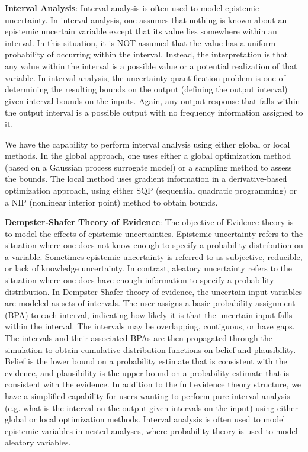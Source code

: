 \textbf{Interval Analysis}: Interval analysis is often used to model 
epistemic uncertainty. In interval analysis, one assumes that nothing 
is known about an epistemic uncertain variable except that its value lies 
somewhere within an interval.  In this situation, it is NOT 
assumed that the value has a uniform probability of occurring 
within the interval.  Instead, the interpretation is that 
any value within the interval is a possible value or a potential 
realization of that variable.  In interval analysis, the 
uncertainty quantification problem is one of determining the 
resulting bounds on the output (defining the output interval) 
given interval bounds on the inputs. Again, any output response 
that falls within the output interval is a possible output 
with no frequency information assigned to it.

We have the capability to perform interval analysis using either
global or local methods. In the global approach, one uses either a 
global optimization method (based on a Gaussian process surrogate model)
or a sampling method to assess the bounds. The
local method uses gradient information in a derivative-based 
optimization approach, using either SQP (sequential quadratic 
programming) or a NIP (nonlinear interior point) method to obtain bounds. 
 
\textbf{Dempster-Shafer Theory of Evidence}: The objective of Evidence
theory is to model the effects of epistemic uncertainties.  Epistemic
uncertainty refers to the situation where one does not know enough
to specify a probability distribution on a variable.  Sometimes epistemic
uncertainty is referred to as subjective, reducible, or lack of knowledge
uncertainty.  In contrast, aleatory uncertainty refers to the situation
where one does have enough information to specify a probability distribution.
In Dempster-Shafer theory of evidence, the uncertain input variables
are modeled as sets of intervals.  The user assigns a basic probability
assignment (BPA) to each interval, indicating how likely it is that the
uncertain input falls within the interval.  The intervals may be
overlapping, contiguous, or have gaps.  The intervals and their associated
BPAs are then propagated through the simulation to obtain cumulative
distribution functions on belief and plausibility.  Belief is the lower
bound on a probability estimate that is consistent with the evidence, and
plausibility is the upper bound on a probability estimate that is consistent
with the evidence. In addition to the full evidence theory structure, 
we have a simplified capability for users wanting to perform pure 
interval analysis (e.g. what is the interval on the output given 
intervals on the input) using either global or local optimization methods. 
Interval analysis is often used to model epistemic variables in 
nested analyses, where probability theory is used to model aleatory variables.

